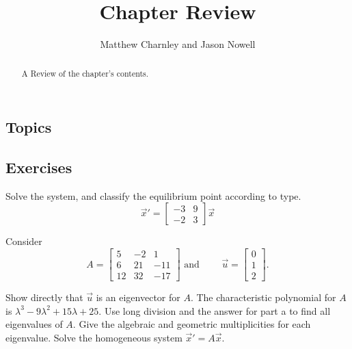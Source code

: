 \documentclass{ximera}
\title{Chapter Review}
\author{Matthew Charnley and Jason Nowell}
\begin{document}
\begin{abstract}
    A Review of the chapter's contents.
\end{abstract}
\maketitle



\subsection{Topics}

\subsection{Exercises}

\begin{exercise}
    Solve the system, and classify the equilibrium point according to type. %
    $$\vec{x}'= \begin{bmatrix}-3 & 9 \\ -2&3 \end{bmatrix} \vec{x}$$
\end{exercise}

\begin{exercise}
    Consider  
    \[
        A=
        \begin{bmatrix} 
            5&-2&1 \\ 
            6&21&-11 \\ 
            12&32&-17
        \end{bmatrix} 
        \mbox{ and } \qquad \vec{u}=
        \begin{bmatrix}
            0\\
            1\\
            2
        \end{bmatrix}.
    \] %
    
    \begin{tasks}
        \task Show directly that $\vec{u}$ is an eigenvector for $A$. 
        \task The characteristic polynomial for $A$ is $\lambda^3-9\lambda^2+15\lambda +25$. Use long division and the answer for part a to find all eigenvalues of $A$. Give the algebraic and geometric multiplicities for each eigenvalue.
        \task Solve the homogeneous system $\vec{x}'= A\vec{x}$.
    \end{tasks}
\end{exercise}
\end{document}
